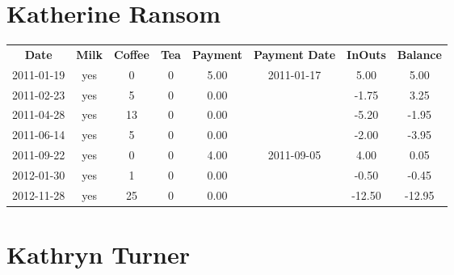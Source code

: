 \section{Katherine Ransom}

\begin{center}
\begin{tabular}{cccccccc}
\textbf{Date} & \textbf{Milk} & \textbf{Coffee} & \textbf{Tea} & \textbf{Payment} & \textbf{Payment Date} & \textbf{InOuts} & \textbf{Balance} \\
2011-01-19 & yes &  0 & 0 & 5.00 & 2011-01-17 &   5.00 &   5.00\\ 
2011-02-23 & yes &  5 & 0 & 0.00 &  &  -1.75 &   3.25\\ 
2011-04-28 & yes & 13 & 0 & 0.00 &  &  -5.20 &  -1.95\\ 
2011-06-14 & yes &  5 & 0 & 0.00 &  &  -2.00 &  -3.95\\ 
2011-09-22 & yes &  0 & 0 & 4.00 & 2011-09-05 &   4.00 &   0.05\\ 
2012-01-30 & yes &  1 & 0 & 0.00 &  &  -0.50 &  -0.45\\ 
2012-11-28 & yes & 25 & 0 & 0.00 &  & -12.50 & -12.95
\end{tabular}
\end{center}

\section{Kathryn Turner}

